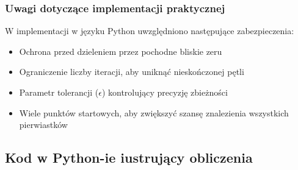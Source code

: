 \documentclass[a4paper,12pt]{article}
\begin{document}
    \subsubsection{Uwagi dotyczące implementacji praktycznej}
    
    W implementacji w języku Python uwzględniono następujące zabezpieczenia:
    \begin{itemize}
        \item Ochrona przed dzieleniem przez pochodne bliskie zeru
        \item Ograniczenie liczby iteracji, aby uniknąć nieskończonej pętli
        \item Parametr tolerancji ($\epsilon$) kontrolujący precyzję zbieżności
        \item Wiele punktów startowych, aby zwiększyć szansę znalezienia wszystkich pierwiastków
    \end{itemize}
    
    \newpage
    
    \subsection{Kod w Python-ie iustrujący obliczenia}
    
\end{document}
